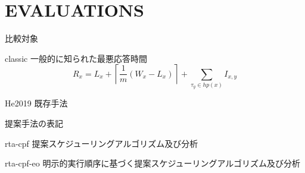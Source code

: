
\section{EVALUATIONS}
\label{sec: EVALUATIONS}


\begin{frame}{比較対象}
    \begin{block}{classic}
        一般的に知られた最悪応答時間
        \begin{equation*}
            R_{x}=L_{x}+\left\lceil\frac{1}{m}\left(W_{x}-L_{x}\right)\right\rceil+\sum_{\tau_{y} \in h p(x)} I_{x, y}
        \end{equation*}
    \end{block}
    \begin{block}{He2019}
        既存手法 \cite{he2019intra}
    \end{block}
\end{frame}

\begin{frame}{提案手法の表記}
    \begin{block}{rta-cpf}
        提案スケジューリングアルゴリズム及び分析
    \end{block}
    \begin{block}{rta-cpf-eo}
        明示的実行順序に基づく提案スケジューリングアルゴリズム及び分析
    \end{block}
\end{frame}

